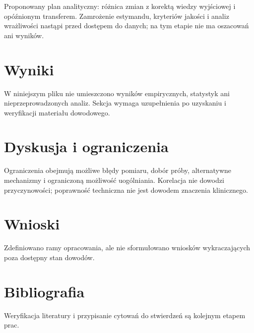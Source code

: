 \documentclass[11pt,a4paper]{article}
\begin{document}
Proponowany plan analityczny: różnica zmian z korektą wiedzy wyjściowej i opóźnionym transferem. Zamrożenie estymandu, kryteriów jakości i analiz wrażliwości nastąpi przed dostępem do danych; na tym etapie nie ma oszacowań ani wyników.

\section{Wyniki}

W niniejszym pliku nie umieszczono wyników empirycznych, statystyk ani nieprzeprowadzonych analiz. Sekcja wymaga uzupełnienia po uzyskaniu i weryfikacji materiału dowodowego.

\section{Dyskusja i ograniczenia}

Ograniczenia obejmują możliwe błędy pomiaru, dobór próby, alternatywne mechanizmy i ograniczoną możliwość uogólniania. Korelacja nie dowodzi przyczynowości; poprawność techniczna nie jest dowodem znaczenia klinicznego.

\section{Wnioski}

Zdefiniowano ramy opracowania, ale nie sformułowano wniosków wykraczających poza dostępny stan dowodów.

\section*{Bibliografia}

Weryfikacja literatury i przypisanie cytowań do stwierdzeń są kolejnym etapem prac.
\end{document}
